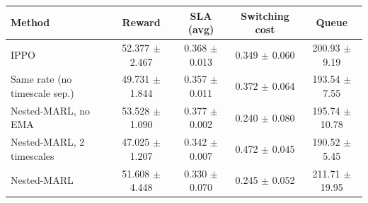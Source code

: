 \begin{tabular}{lcccc}
\toprule
Method & Reward & SLA (avg) & Switching cost & Queue \\
\midrule
IPPO & 52.377 $\pm$ 2.467 & 0.368 $\pm$ 0.013 & 0.349 $\pm$ 0.060 & 200.93 $\pm$ 9.19 \\
Same rate (no timescale sep.) & 49.731 $\pm$ 1.844 & 0.357 $\pm$ 0.011 & 0.372 $\pm$ 0.064 & 193.54 $\pm$ 7.55 \\
Nested-MARL, no EMA & 53.528 $\pm$ 1.090 & 0.377 $\pm$ 0.002 & 0.240 $\pm$ 0.080 & 195.74 $\pm$ 10.78 \\
Nested-MARL, 2 timescales & 47.025 $\pm$ 1.207 & 0.342 $\pm$ 0.007 & 0.472 $\pm$ 0.045 & 190.52 $\pm$ 5.45 \\
Nested-MARL & 51.608 $\pm$ 4.448 & 0.330 $\pm$ 0.070 & 0.245 $\pm$ 0.052 & 211.71 $\pm$ 19.95 \\
\bottomrule
\end{tabular}